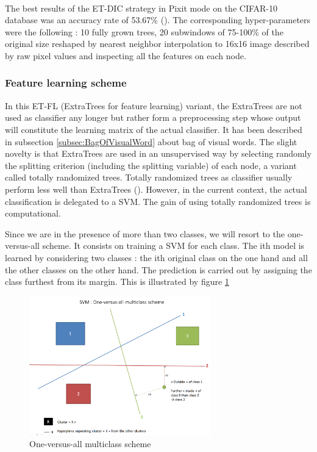 \documentclass[a4paper]{report}
\begin{document}
			\paragraph{}
			The best results of the ET-DIC strategy in Pixit mode on the CIFAR-10 database was an accuracy rate of 53.67\% (\cite{base}). The corresponding hyper-parameters were the following : 10 fully grown trees, 20 subwindows of 75-100\% of the original size reshaped by nearest neighbor interpolation to 16x16 image described by raw pixel values and inspecting all the features on each node.
			
			
			\subsubsection{Feature learning scheme}
			In this ET-FL (ExtraTrees for feature learning) variant, the ExtraTrees are not used as classifier any longer but rather form a preprocessing step whose output will constitute the learning matrix of the actual classifier. It has been described in subsection \ref{subsec:BagOfVisualWord} about bag of visual words. The slight novelty is that ExtraTrees are used in an unsupervised way by selecting randomly the splitting criterion (including the splitting variable) of each node, a variant called totally randomized trees. Totally randomized trees as classifier usually perform less well than ExtraTrees (\cite{extratrees}). However, in the current context, the actual classification is delegated to a SVM. The gain of using totally randomized trees is computational.
		\par
		Since we are in the presence of more than two classes, we will resort to the one-versus-all scheme. It consists on training a SVM for each class. The ith model is learned by considering two classes : the ith original class on the one hand and all the other classes on the other hand. The prediction is carried out by assigning the class furthest from its margin. This is illustrated by figure \ref{fig:SVMOneVersusAll}
		\begin{figure}
			\centering
				\includegraphics[width=0.7\textwidth]{images/SVMOneVersusAll.png}
			\caption{\label{fig:SVMOneVersusAll}One-versus-all multiclass scheme}
		\end{figure}
		
\end{document}
